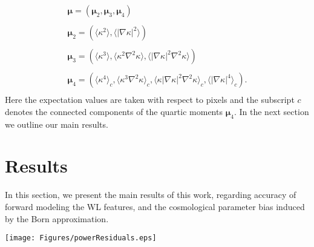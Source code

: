 \documentclass[reprint,aps,prd,superscriptaddress,showkeys,showpacs]{revtex4-1}
\newcommand{\bb}[1]{\mathbf{#1}}
\begin{document}
\begin{equation}
\label{par:moments}
\begin{matrix}
\pmb{\mu} = (\pmb{\mu}_2,\pmb{\mu}_3,\pmb{\mu}_4) \\ \\
\pmb{\mu}_2 = \left(\langle\kappa^2\rangle,\langle\vert\nabla\kappa\vert^2\rangle\right) \\ \\
\pmb{\mu}_3 = \left(\langle\kappa^3\rangle,\langle\kappa^2\nabla^2\kappa\rangle,\langle\vert\nabla\kappa\vert^2\nabla^2\kappa\rangle\right) \\ \\
\pmb{\mu}_4 = \left(\langle\kappa^4\rangle_c,\langle\kappa^3\nabla^2\kappa\rangle_c,\langle\kappa\vert\nabla\kappa\vert^2\nabla^2\kappa\rangle_c,\langle\vert\nabla\kappa\vert^4\rangle_c\right).\\
\end{matrix}
\end{equation} 
%
Here the expectation values are taken with respect to pixels and the subscript $c$ denotes the connected components of the quartic moments $\pmb{\mu}_4$. In the next section we outline our main results.  


\section{Results}
\label{sec:results}
% 
In this section, we present the main results of this work, regarding accuracy of forward modeling the WL features, and the cosmological parameter bias induced by the Born approximation.

\begin{figure*}
\begin{center}
\texttt{[image: Figures/powerResiduals.eps]}
\end{center}
\caption{Contributions at different $\Phi$ orders to the $\kappa$ power spectrum: the left panel shows the auto power spectra $P_{\rm born,born}$ ($O(\Phi^2)$) and $P_{\rm ll},P_{\rm geo}$ ($O(\Phi^4)$). The right panel shows the residuals between the power spectrum of the full ray--traced $\kappa$ field and the one obtained with the Born approximation. For reference, we show the shape noise contributions (black dashed) and the first non--trivial reduced shear corrections to $P^{\kappa\kappa}$ \textbf{\color{red} (black solid)}, which can be both added to the forward models after the line of sight integration. \textbf{\color{red} We also show as an orange line the level of cosmic variance for the power spectrum expected in a LSST--like survey.} Gaussian convolution effects with a window of size $\theta_G=0.5\,{\rm arcmin}$ are included. The residuals are compared to the two $O(\Phi^3)$ terms $2P_{\rm born,ll},2P_{\rm born,geo}$. The quantities shown are the ensemble averages over 8192 realizations of $\kappa$ in the fiducial cosmology $\bb{p}_0$.}
\label{fig:psResiduals}
\end{figure*}
\end{document}
